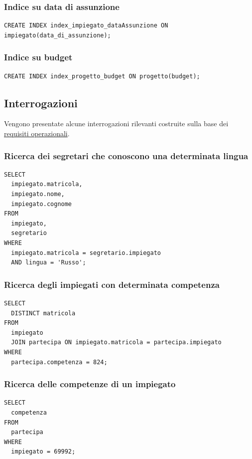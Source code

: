 \documentclass{article}
\begin{document}
\subsubsection{Indice su data di assunzione}
\begin{verbatim}
CREATE INDEX index_impiegato_dataAssunzione ON impiegato(data_di_assunzione);

\end{verbatim}

\subsubsection{Indice su budget}
\begin{verbatim}
CREATE INDEX index_progetto_budget ON progetto(budget);

\end{verbatim}

\subsection{Interrogazioni}
Vengono presentate alcune interrogazioni rilevanti costruite sulla base dei \hyperlink{page.17}{requisiti operazionali}.

\subsubsection{Ricerca dei segretari che conoscono una determinata lingua}
\begin{verbatim}
SELECT 
  impiegato.matricola, 
  impiegato.nome, 
  impiegato.cognome 
FROM 
  impiegato, 
  segretario 
WHERE 
  impiegato.matricola = segretario.impiegato 
  AND lingua = 'Russo';
\end{verbatim}

\subsubsection{Ricerca degli impiegati con determinata competenza}
\begin{verbatim}
SELECT 
  DISTINCT matricola 
FROM 
  impiegato 
  JOIN partecipa ON impiegato.matricola = partecipa.impiegato 
WHERE 
  partecipa.competenza = 824;
\end{verbatim}

\subsubsection{Ricerca delle competenze di un impiegato}
\begin{verbatim}
SELECT 
  competenza 
FROM 
  partecipa 
WHERE 
  impiegato = 69992;
\end{verbatim}
\end{document}
